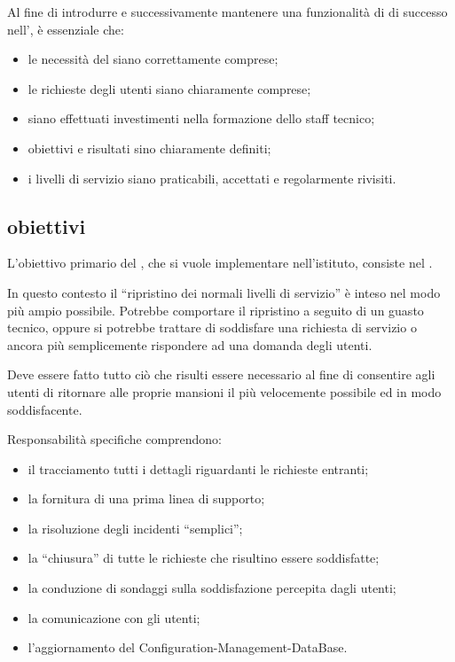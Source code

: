 Al fine di introdurre e successivamente mantenere una funzionalità di  di successo nell'\entity{}, è essenziale che:

\begin{itemize}
\item{le necessità del  siano correttamente comprese;}
\item{le richieste degli utenti siano chiaramente comprese;}
\item{siano effettuati investimenti nella formazione dello staff tecnico;}
\item{obiettivi e risultati sino chiaramente definiti;}
\item{i livelli di servizio siano praticabili, accettati e regolarmente rivisiti.}
\end{itemize}

\subsection[Obiettivi]{obiettivi}
\label{sd-introduction-objectives}
L'obiettivo primario del , che si vuole implementare nell'istituto, consiste nel . 

In questo contesto il ``ripristino dei normali livelli di servizio'' è inteso nel modo più ampio possibile. Potrebbe comportare il ripristino a seguito di un guasto tecnico, oppure si potrebbe trattare di soddisfare una richiesta di servizio o ancora più semplicemente rispondere ad una domanda degli utenti. 

Deve essere fatto tutto ciò che risulti essere necessario al fine di consentire agli utenti di ritornare alle proprie mansioni il più velocemente possibile ed in modo soddisfacente.

Responsabilità specifiche comprendono:

\begin{itemize}
\item{il tracciamento tutti i dettagli riguardanti le richieste entranti;}
\item{la fornitura di una prima linea di supporto;}
\item{la risoluzione degli incidenti ``semplici'';}
\item{la ``chiusura'' di tutte le richieste che risultino essere soddisfatte;}
\item{la conduzione di sondaggi sulla soddisfazione percepita dagli utenti;}
\item{la comunicazione con gli utenti;}
\item{l'aggiornamento del \acf{Configuration-Management-DataBase}.}
\end{itemize}